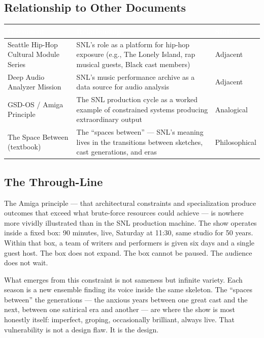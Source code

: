 \documentclass[11pt,letterpaper]{article}
\newcommand{\tableheader}[1]{\textbf{\sffamily\textcolor{white}{#1}}}
\begin{document}
\subsection{Relationship to Other Documents}

\begin{center}
\begin{tabularx}{\textwidth}{L{4.5cm}XC{2.2cm}}
\toprule
{}
\tableheader{Document} & \tableheader{Relationship} & \tableheader{Status} \\
\midrule
Seattle Hip-Hop Cultural Module Series & SNL's role as a platform for hip-hop exposure (e.g., The Lonely Island, rap musical guests, Black cast members) & Adjacent \\
Deep Audio Analyzer Mission & SNL's music performance archive as a data source for audio analysis & Adjacent \\
GSD-OS / Amiga Principle & The SNL production cycle as a worked example of constrained systems producing extraordinary output & Analogical \\
The Space Between (textbook) & The ``spaces between'' --- SNL's meaning lives in the transitions between sketches, cast generations, and eras & Philosophical \\
\bottomrule
\end{tabularx}
\end{center}

\subsection{The Through-Line}

The Amiga principle --- that architectural constraints and specialization produce outcomes that exceed what brute-force resources could achieve --- is nowhere more vividly illustrated than in the SNL production machine. The show operates inside a fixed box: 90 minutes, live, Saturday at 11:30, same studio for 50 years. Within that box, a team of writers and performers is given six days and a single guest host. The box does not expand. The box cannot be paused. The audience does not wait.

What emerges from this constraint is not sameness but infinite variety. Each season is a new ensemble finding its voice inside the same skeleton. The ``spaces between'' the generations --- the anxious years between one great cast and the next, between one satirical era and another --- are where the show is most honestly itself: imperfect, groping, occasionally brilliant, always live. That vulnerability is not a design flaw. It is the design.
\end{document}

